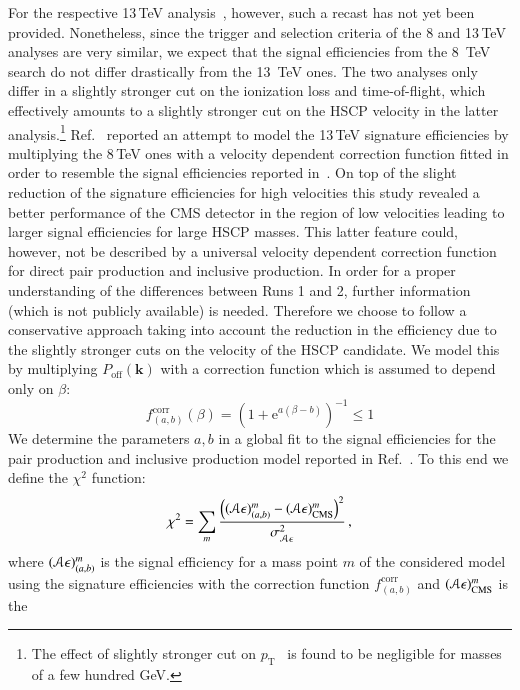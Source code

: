 \documentclass[preprint,number,sort&compress,twocolumn,3p]{elsstyarticle}
\renewcommand{\vec}[1]{\boldsymbol{#1}}
\newcommand{\E}{\mathrm{e}}
\begin{document}
\begin{appendix}
For the respective 13\,TeV analysis~\cite{CMS-PAS-EXO-16-036}, however, such a recast has not yet been provided. Nonetheless, since the trigger and selection criteria of the 8 and 13\,TeV analyses are very similar, we 
expect that the signal efficiencies from the 8~TeV search do not
differ drastically from the 13~TeV ones.
The two analyses only differ in a slightly stronger cut on the ionization loss and time-of-flight, which effectively amounts
to a slightly stronger cut on the HSCP velocity in the latter analysis.\footnote{The effect of slightly stronger cut on $p_\text{T}$~\cite{CMS-PAS-EXO-16-036} is found to be negligible for masses of a few hundred GeV.}
Ref.~\cite{Brooijmans:2018xbu}
reported an attempt to model the 13\,TeV signature efficiencies by multiplying the 8\,TeV ones with
a velocity dependent correction function fitted in order to resemble the signal efficiencies reported in~\cite{CMS-PAS-EXO-16-036}.
On top of the slight reduction of the signature efficiencies for high velocities this study revealed a better performance of the CMS detector in the region of low velocities leading to larger signal efficiencies
for large HSCP masses. This latter feature could, however, not be described by a universal velocity dependent correction function for direct pair production and inclusive production. In order for a proper understanding of the differences between Runs 1 and 2, further information (which is not publicly available) is needed.
Therefore we choose to follow a conservative approach taking into account the reduction in the efficiency due to the slightly
stronger cuts on the velocity of the HSCP candidate. 
We model this by multiplying $P_\text{off}(\vec{k})$ with a correction function which is assumed to depend only on $\beta$:
\begin{equation}
f_{(a,b)}^\text{corr}(\beta) = \left(1+\E^{a (\beta-b)}\right)^{-1}\le1
\end{equation}
We determine the parameters $a,b$ in a 
global fit to the signal efficiencies for the pair production and inclusive production model reported in Ref.~\cite{CMS-PAS-EXO-16-036}. 
To this end we define the $\chi^2$ function:
\begin{equation}
\label{eq:chi2}
\chi^2 = \sum_m \frac{\left(({\cal A}\epsilon)^m_{(a,b)} - ({\cal A}\epsilon)^m_\text{CMS}\right)^2}{\sigma_{{\cal A}\epsilon}^2}\,,
\end{equation}
where $({\cal A}\epsilon)^m_{(a,b)}$ is the signal efficiency for a mass point $m$ of the considered model
using the signature efficiencies with the correction function $f_{(a,b)}^\text{corr}$ and $({\cal A}\epsilon)^m_\text{CMS}$ is the 

\end{appendix}
\end{document}
